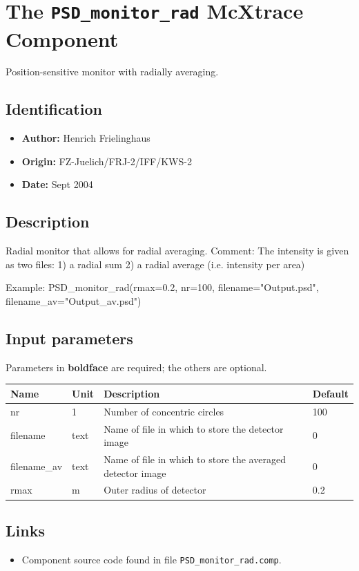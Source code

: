 \section{The \texttt{PSD\_monitor\_rad} McXtrace Component}
Position-sensitive monitor with radially averaging.

\subsection*{Identification}
\begin{itemize}
  \item \textbf{Author:} Henrich Frielinghaus
  \item \textbf{Origin:} FZ-Juelich/FRJ-2/IFF/KWS-2
  \item \textbf{Date:} Sept 2004
\end{itemize}

\subsection*{Description}
Radial monitor that allows for radial averaging. Comment: The intensity is given as two files: 1) a radial sum 2) a radial average (i.e. intensity per area)

Example: PSD\_monitor\_rad(rmax=0.2, nr=100, filename="Output.psd", filename\_av="Output\_av.psd")

\subsection*{Input parameters}
Parameters in \textbf{boldface} are required; the others are optional.

\begin{longtable}{p{}p{}p{}p{}}
\toprule
\textbf{Name} & \textbf{Unit} & \textbf{Description} & \textbf{Default} \\
\midrule
\endhead
nr & 1 & Number of concentric circles & 100 \\
filename & text & Name of file in which to store the detector image & 0 \\
filename\_av & text & Name of file in which to store the averaged detector image & 0 \\
rmax & m & Outer radius of detector & 0.2 \\
\bottomrule
\end{longtable}

\subsection*{Links}
\begin{itemize}
  \item Component source code found in file \texttt{PSD\_monitor\_rad.comp}.
\end{itemize}
